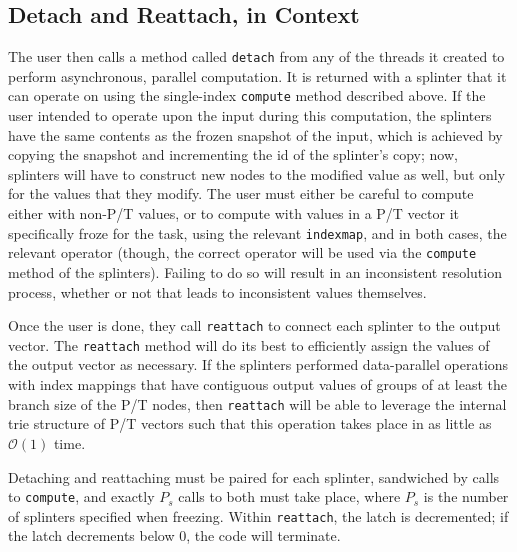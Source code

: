 \subsection{Detach and Reattach, in Context}
The user then calls a method called \texttt{detach} from any of the threads it created 
to perform asynchronous, parallel computation. It is returned with a splinter that it 
can operate on using the single-index \texttt{compute} method described above. If the 
user intended to operate upon the input during this computation, the  
splinters have the same contents as the frozen snapshot of the input, which is achieved 
by copying the snapshot and incrementing the id of the splinter's copy; now, splinters 
will have to construct new nodes to the modified value as well, but only for the values 
that they modify. The user 
must either be careful to compute either with non-P/T values, or to compute with values 
in a P/T vector it specifically froze for the task, using the relevant \texttt{indexmap}, and in 
both cases, the relevant operator (though, the correct operator will be used via the
\texttt{compute} method of the splinters). Failing to do so will result in an inconsistent 
resolution process, whether or not that leads to inconsistent values themselves.

Once the user is done, they call \texttt{reattach} to connect each splinter to the output 
vector. The \texttt{reattach} method will do its best to efficiently assign the values 
of the output vector as necessary. If the splinters performed data-parallel operations 
with index mappings that have contiguous output values of groups of at least the branch size 
of the P/T nodes, then \texttt{reattach} will be able to leverage the internal trie 
structure of P/T vectors such that this operation takes place in as little as $\mathcal{O}(1)$
time.

Detaching and reattaching must be paired for each splinter, sandwiched by calls to
\texttt{compute}, and exactly $P_s$ calls to both must take 
place, where $P_s$ is the number of splinters specified when freezing. Within 
\texttt{reattach}, the latch is decremented; if the latch decrements below 0, the code 
will terminate.

